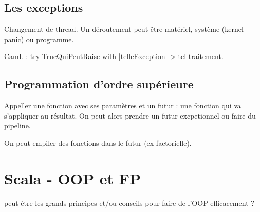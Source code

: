 \documentclass[french]{article}
\begin{document}
\subsection{Les exceptions}
Changement de thread. Un déroutement peut être matériel, système (kernel panic) ou programme.

CamL : try TrucQuiPeutRaise with |telleException -> tel traitement.

\subsection{Programmation d'ordre supérieure}
Appeller une fonction avec ses paramètres et un futur : une fonction qui va s'appliquer au résultat. On peut alors prendre un futur excpetionnel ou faire du pipeline.

On peut empiler des fonctions dans le futur (ex factorielle).


\section{Scala - OOP et FP}


peut-être les grands principes et/ou conseils pour faire de l'OOP efficacement ?
\end{document}
